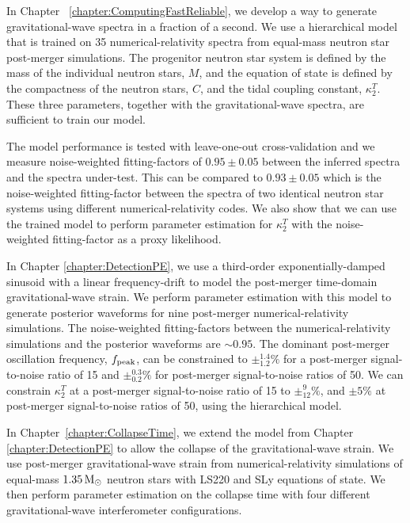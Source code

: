 \documentclass[../Thesis.tex]{subfiles}
\begin{document}
    In Chapter ~\ref{chapter:ComputingFastReliable}, we develop a way to generate gravitational-wave spectra in a fraction of a second.
    We use a hierarchical model that is trained on 35 numerical-relativity spectra from equal-mass neutron star post-merger simulations.
    The progenitor neutron star system is defined by the mass of the individual neutron stars, $M$, and the equation of state is defined by the compactness of the neutron stars, $C$, and the tidal coupling constant, $\kappa_2^T$.
    These three parameters, together with the gravitational-wave spectra, are sufficient to train our model. \par
    
    The model performance is tested with leave-one-out cross-validation and we measure noise-weighted fitting-factors of $0.95\pm 0.05$ between the inferred spectra and the spectra under-test.
    This can be compared to $0.93\pm 0.05$ which is the noise-weighted fitting-factor between the spectra of two identical neutron star systems using different numerical-relativity codes.
    We also show that we can use the trained model to perform parameter estimation for $\kappa_2^T$ with the noise-weighted fitting-factor as a proxy likelihood.
    
    In Chapter \ref{chapter:DetectionPE}, we use a third-order exponentially-damped sinusoid with a linear frequency-drift to model the post-merger time-domain gravitational-wave strain.
    We perform parameter estimation with this model to generate posterior waveforms for nine post-merger numerical-relativity simulations.
    The  noise-weighted fitting-factors between the numerical-relativity simulations and the posterior waveforms are $\sim 0.95$.
    The dominant post-merger oscillation frequency, $f_{\mathrm{peak}}$, can be constrained to $\pm_{1.2}^{1.4}\%$ for a post-merger signal-to-noise ratio of 15 and $\pm_{0.2}^{0.3}\%$ for post-merger signal-to-noise ratios of 50.
    We can constrain $\kappa_2^T$ at a post-merger signal-to-noise ratio of 15 to $\pm^{9}_{12}\%$, and $\pm 5\%$ at post-merger signal-to-noise ratios of 50,  using the hierarchical model. \par

    In Chapter~\ref{chapter:CollapseTime}, we extend the model from Chapter \ref{chapter:DetectionPE} to allow the collapse of the gravitational-wave strain.
    We use post-merger gravitational-wave strain from numerical-relativity simulations of equal-mass $1.35\,\mathrm{M}_{\odot}$ neutron stars with LS220 and SLy equations of state.
    We then perform parameter estimation on the collapse time with four different gravitational-wave interferometer configurations. \par
    
\end{document}
